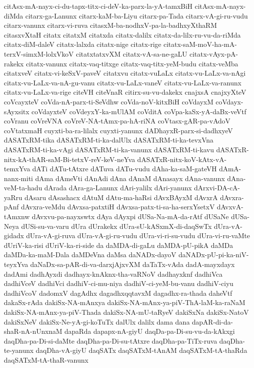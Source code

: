 {citAsx-mA-nayx-ci-du-tapx-titx-ci-deV-ka-parx-la-yA-tamxBiH
citAsx-mA-nayx-diMda
citarx-ga-Lanunx
citarx-kaM-ba-Liyu
citarx-pa-Tada
citarx-vA-gi-ru-vudu
citarx-vanunx
citarx-vi-ruva
citasxM-ba-nodhxV-pa-la-badhxyXthaRM
citasxvXtaH
citatx
citatxM
citatxda
citatx-dalilx
citatx-da-lilx-ru-vu-da-riMda
citatx-diM-daleV
citatx-lalxda
citatx-nige
citatx-rige
citatx-saM-moV-ha-mA-terxV-simxM-lolxVkoV
citatxtatxvXM
citatx-vA-sa-ne-gaLU
citatx-vAyx-pA-rakekx
citatx-vanunx
citatx-vaq-titxge
citatx-vaq-titx-yeM-budu
citatx-veMba
citatxveV
citatx-vi-keSxV-paveV
citatxvu
citatx-vuLaLx
citatx-vu-LaLx-va-nAgi
citatx-vu-LaLx-va-nA-gu-vanu
citatx-vu-LaLx-vaneV
citatx-vu-LaLx-va-ranunx
citatx-vu-LaLx-va-rige
citeVH
citeVnaR
citirx-su-vu-dakekx
cnajxsA
cnajxyXteV
coVcayxteV
coVda-nA-parx-ti-SeVdhw
coVda-noV-kitxBiH
coVdayxM
coVdayx-sAyxsitx
coVdayxteV
coVdeyxY-ka-mUlAM
coVditA
coVpa-kaSx-yA-daBx-veVtf
coVranu
coVreVNA
coVreV-NA-tAmx-pa-hA-riNA
coVtasx-gAR-pa-vAdoV
coVtatxmaH
cuyxti-ba-ra-lilalx
cuyxti-yanunx
dADhayxR-parx-si-dadhxyeV
dASATxRM-tika
dASATxRM-ti-ka-dalUlx
dASATxRM-ti-ka-tevxVna
dASATxRM-ti-ka-vAgi
dASATxRM-ti-ka-vanunx
dASATxRM-ti-kavu
dASATxR-nitx-kA-thAR-saM-Bi-tetxV-reV-keV-neYva
dASATxR-nitx-koV-kAtx-vA-temxYva
dATi
dATu-tAtxre
dATuva
dATu-vudu
dAha-ka-saM-gateVH
dAmA-nanx-miti
dAma
dAmeVti
dAnAdi
dAna
dAnaM
dAnasayx
dAna-vanunx
dAna-veM-ta-hadu
dArada
dAra-ga-Lanunx
dAri-yalilx
dAri-yanunx
dArxvi-DA-cA-yaRru
dAsaru
dAsashacx
dAtuM
dAtu-ma-haRsi
dAvxBAyxM
dAvxrA
dAvxra-pAnf
dAvxra-veMdu
dAvxsa-patxtiH
dAvxsa-patx-ti-sa-ha-serxYsetxV
dAvxvA-tAmxnw
dAvxvu-pa-nayxswtx
dAya
dAyxpi
dUSa-Na-mA-da-rAtf
dUSaNe
dUSa-Neya
dUSi-su-va-varu
dUra
dUrakekx
dUra-sU-kASxmX-di-daqSwTx
dUra-vA-gidadx
dUra-vA-gi-ruva
dUra-vA-gi-ru-vudu
dUra-vi-ri-su-vudu
dUra-vi-ru-vaMte
dUriV-ka-risi
dUriV-ka-ri-side
da
daMDA-di-gaLu
daMDA-pU-pikA
daMDa
daMDa-ka-maM-Dala
daMDeVna
daMsa
daNADx-dayoV
daNADx-pU-pi-ka-niV-teyxYva
daNaDx-sa-pAR-di-va-darxjAjxvXM
daTaTx-vAda
dadA-mayxdayx
dadAmi
dadhAyxdi
dadhayx-knAknx-tha-vaRNoV
dadhayxknf
dadhiVca
dadhiVceV
dadhiVci
dadhiV-ci-mu-niya
dadhiV-ci-yeM-bu-vanu
dadhiV-ciyu
dadhiVcoV
dadomxV
dagAdhx
dagadhxqqtavxM
dagadhx-ra-thada
daheVtf
dakaSx-rAda
dakiSx-NA-mAnxya
dakiSx-NA-mAnx-ya-piV-ThA-laM-ka-raNaM
dakiSx-NA-mAnx-ya-piV-Thada
dakiSx-NA-mU-taRyeV
dakiSxNa
dakiSx-NatoV
dakiSxNeV
dakiSx-Ne-yA-gi-koTuTx
dalUlx
dalilx
dama
dana
dapAR-di-da-shaR-nA-nUnxnaM
dapaRda
dapapx-nA-giyU
daqDa-pa-Di-su-vu-da-kAkxgi
daqDha-pa-Di-si-daMte
daqDha-pa-Di-su-tAtxre
daqDha-pa-TiTx-ruva
daqDha-te-yanunx
daqDha-vA-giyU
daqSATx
daqSATxM-tAnAM
daqSATxM-tA-thaRda
daqSATxM-tA-thaR-vanunx
}
